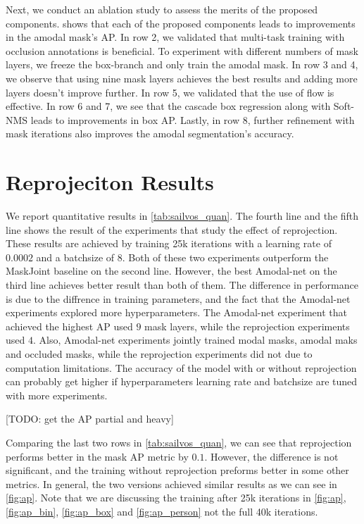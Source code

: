 Next, we conduct an ablation study to assess the merits of the proposed components.   shows that each of the proposed components leads to improvements in the amodal mask's AP.
In row 2, we validated that multi-task training with occlusion annotations is beneficial. 
To experiment with different numbers of mask layers, we freeze the box-branch and only train the amodal mask.
In row 3 and 4, we observe that using nine mask layers achieves the best results and adding more layers doesn't improve further. In row 5, we validated that the use of flow is effective. 
In row 6 and 7, we see that the cascade box regression along with Soft-NMS leads to improvements in box AP. Lastly, in row 8, further refinement with mask iterations also improves the amodal segmentation's accuracy.



\section{Reprojeciton Results}
We report quantitative results in \ref{tab:sailvos_quan}. The fourth line and the fifth line shows the result of the experiments that study the effect of reprojection. These results are achieved by training 25k iterations with a learning rate of $0.0002$ and a batchsize of $8$. Both of these two experiments outperform the MaskJoint baseline on the second line. However, the best Amodal-net on the third line achieves better result than both of them. The difference in performance is due to the diffrence in training parameters, and the fact that the Amodal-net experiments explored more hyperparameters. The Amodal-net experiment that achieved the highest AP used $9$ mask layers, while the reprojection experiments used $4$. Also, Amodal-net experiments jointly trained modal masks, amodal maks and occluded masks, while the reprojection experiments did not due to computation limitations. The accuracy of the model with or without reprojection can probably get higher if hyperparameters \eg learning rate and batchsize are tuned with more experiments. 

 
[TODO: get the AP partial and heavy]

Comparing the last two rows in \ref{tab:sailvos_quan}, we can see that reprojection performs better in the mask AP metric by $0.1$. However, the difference is not significant, and the training without reprojection preforms better in some other metrics. In general, the two versions achieved similar results as we can see in \ref{fig:ap}. Note that we are discussing the training after 25k iterations in \ref{fig:ap}, \ref{fig:ap_bin}, \ref{fig:ap_box} and \ref{fig:ap_person} not the full 40k iterations. 

